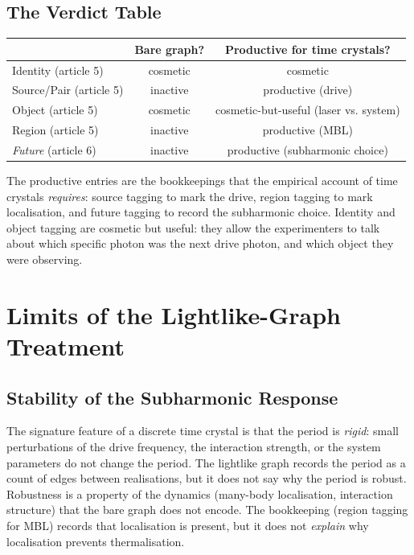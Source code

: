 \documentclass[11pt]{article}
\begin{document}
\subsection{The Verdict Table}

\begin{center}
\begin{tabular}{lcc}
                              & \textbf{Bare graph?} & \textbf{Productive for time crystals?} \\ \hline
Identity (article 5)          & cosmetic & cosmetic \\
Source/Pair (article 5)       & inactive & productive (drive) \\
Object (article 5)            & cosmetic & cosmetic-but-useful (laser vs. system) \\
Region (article 5)            & inactive & productive (MBL) \\
\textit{Future} (article 6)    & inactive & productive (subharmonic choice) \\
\end{tabular}
\end{center}
The productive entries are the bookkeepings that the empirical account of time crystals \emph{requires}: source tagging to mark the drive, region tagging to mark localisation, and future tagging to record the subharmonic choice. Identity and object tagging are cosmetic but useful: they allow the experimenters to talk about which specific photon was the next drive photon, and which object they were observing.

\section{Limits of the Lightlike-Graph Treatment}
\label{sec:limits}

\subsection{Stability of the Subharmonic Response}

The signature feature of a discrete time crystal is that the period is \emph{rigid}: small perturbations of the drive frequency, the interaction strength, or the system parameters do not change the period. The lightlike graph records the period as a count of edges between realisations, but it does not say why the period is robust. Robustness is a property of the dynamics (many-body localisation, interaction structure) that the bare graph does not encode. The bookkeeping (region tagging for MBL) records that localisation is present, but it does not \emph{explain} why localisation prevents thermalisation.
\end{document}
